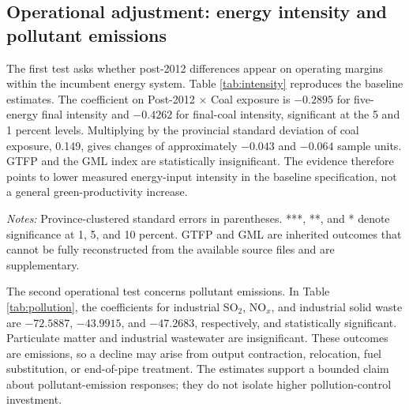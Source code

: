 \documentclass[11pt]{article}
\newcommand{\note}[1]{\begin{minipage}{0.96\textwidth}\footnotesize\textit{Notes:} #1\end{minipage}}
\begin{document}
\subsection{Operational adjustment: energy intensity and pollutant emissions}

The first test asks whether post-2012 differences appear on operating margins within the incumbent energy system. Table \ref{tab:intensity} reproduces the baseline estimates. The coefficient on Post-2012 $\times$ Coal exposure is $-0.2895$ for five-energy final intensity and $-0.4262$ for final-coal intensity, significant at the 5 and 1 percent levels. Multiplying by the provincial standard deviation of coal exposure, 0.149, gives changes of approximately $-0.043$ and $-0.064$ sample units. GTFP and the GML index are statistically insignificant. The evidence therefore points to lower measured energy-input intensity in the baseline specification, not a general green-productivity increase.

\begin{table}[H]
\centering
\caption{Post-policy coal exposure and energy intensity}
\label{tab:intensity}
\note{Province-clustered standard errors in parentheses. ***, **, and * denote significance at 1, 5, and 10 percent. GTFP and GML are inherited outcomes that cannot be fully reconstructed from the available source files and are supplementary.}
\end{table}

The second operational test concerns pollutant emissions. In Table \ref{tab:pollution}, the coefficients for industrial SO$_2$, NO$_x$, and industrial solid waste are $-72.5887$, $-43.9915$, and $-47.2683$, respectively, and statistically significant. Particulate matter and industrial wastewater are insignificant. These outcomes are emissions, so a decline may arise from output contraction, relocation, fuel substitution, or end-of-pipe treatment. The estimates support a bounded claim about pollutant-emission responses; they do not isolate higher pollution-control investment.
\end{document}
